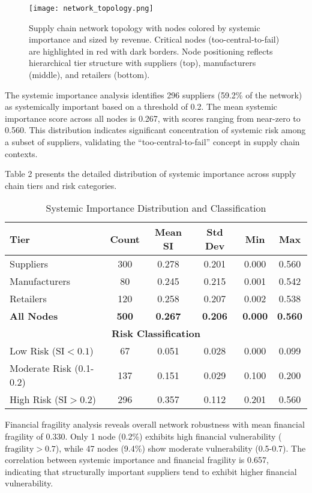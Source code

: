 \documentclass[a4 paper, 11pt,twoside]{article}
\newcommand{\0}{\Bf{0}}
\theoremstyle{definition}
\begin{document}
\begin{figure}[H]
\centering
\texttt{[image: network\_topology.png]}
\caption{Supply chain network topology with nodes colored by systemic importance and sized by revenue. Critical nodes (too-central-to-fail) are highlighted in red with dark borders. Node positioning reflects hierarchical tier structure with suppliers (top), manufacturers (middle), and retailers (bottom).}
\end{figure}
The systemic importance analysis identifies 296 suppliers (59.2\% of the network) as systemically important based on a threshold of 0.2. The mean systemic importance score across all nodes is 0.267, with scores ranging from near-zero to 0.560. This distribution indicates significant concentration of systemic risk among a subset of suppliers, validating the ``too-central-to-fail'' concept in supply chain contexts.

Table 2 presents the detailed distribution of systemic importance across supply chain tiers and risk categories.

\begin{table}[H]
\centering
\caption{Systemic Importance Distribution and Classification}
\begin{tabular}{@{}lccccc@{}}
\toprule
\textbf{Tier} & \textbf{Count} & \textbf{Mean SI} & \textbf{Std Dev} & \textbf{Min} & \textbf{Max} \\
\midrule
Suppliers & 300 & 0.278 & 0.201 & 0.000 & 0.560 \\
Manufacturers & 80 & 0.245 & 0.215 & 0.001 & 0.542 \\
Retailers & 120 & 0.258 & 0.207 & 0.002 & 0.538 \\
\midrule
\textbf{All Nodes} & \textbf{500} & \textbf{0.267} & \textbf{0.206} & \textbf{0.000} & \textbf{0.560} \\
\midrule
\multicolumn{6}{c}{\textbf{Risk Classification}} \\
\midrule
Low Risk ($\text{SI} < 0.1$) & 67 & 0.051 & 0.028 & 0.000 & 0.099 \\
Moderate Risk (0.1-0.2) & 137 & 0.151 & 0.029 & 0.100 & 0.200 \\
High Risk ($\text{SI} > 0.2$) & 296 & 0.357 & 0.112 & 0.201 & 0.560 \\
\bottomrule
\end{tabular}
\end{table}

Financial fragility analysis reveals overall network robustness with mean financial fragility of 0.330. Only 1 node (0.2\%) exhibits high financial vulnerability ($\text{fragility} > 0.7$), while 47 nodes (9.4\%) show moderate vulnerability (0.5-0.7). The correlation between systemic importance and financial fragility is 0.657, indicating that structurally important suppliers tend to exhibit higher financial vulnerability.
\end{document}
